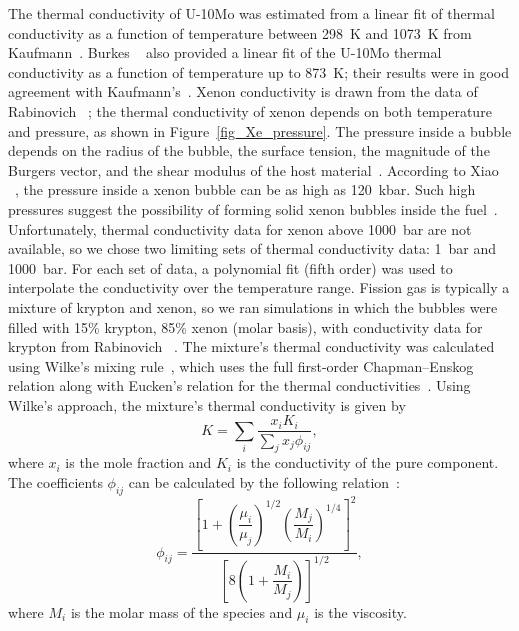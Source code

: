 The thermal conductivity of \mbox{U-10Mo} was estimated from a linear fit of thermal conductivity as a function of temperature between 298~K and 1073~K from Kaufmann~\cite{kaufmann1962nuclear}. Burkes \etal~\cite{burkes2010thermo} also provided a linear fit of the \mbox{U-10Mo} thermal conductivity as a function of temperature up to 873~K; their results were in good agreement with Kaufmann's~\cite{kaufmann1962nuclear}.
{Xenon conductivity is drawn from the data of Rabinovich \etal~\cite{rabinovich1987thermophysical};}
the thermal conductivity of xenon depends on both temperature and pressure,
as shown in Figure~\ref{fig_Xe_pressure}. The pressure inside a bubble depends on the radius of the bubble, the surface tension, the magnitude of the Burgers vector, and the shear modulus of the host material~\cite{greenwood1959role,trinkaus1983energetics}. According to Xiao \etal~\cite{xiao2015atomistic}, the pressure inside a xenon bubble can be as high as 120~kbar. Such high pressures suggest the possibility of forming solid xenon bubbles inside the fuel~\cite{thomas1991condensed,ross1980condensed,zheng2014thermodynamics}. Unfortunately, thermal conductivity data for xenon above 1000~bar are not available, so we chose two limiting sets of thermal conductivity data: 1~bar and 1000~bar. For each set of data, a polynomial fit (fifth order) was used to interpolate the conductivity over the temperature range.
{Fission gas is typically a mixture of krypton and xenon, so
we ran simulations in which the bubbles were filled with 15\% krypton,
85\% xenon (molar basis), with conductivity data for krypton from Rabinovich \etal~\cite{rabinovich1987thermophysical}. The mixture's thermal conductivity was calculated using Wilke's mixing rule~\cite{wilke1950viscosity}, which uses the full first-order Chapman--Enskog relation along with Eucken's relation for the thermal conductivities~\cite{vincenti1965introduction, alkandry2013comparison}. Using Wilke's approach, the mixture's thermal conductivity is given by
\begin{equation}
  K = \sum_i \frac{x_iK_i}{\sum_j x_j \phi_{ij}},
  \label{eq:K-mixture}
\end{equation}
where $x_i$ is the mole fraction and $K_i$ is the conductivity of the pure
component. The coefficients $\phi_{ij}$ can be calculated by the following
relation~\cite{alkandry2013comparison}:
\begin{equation}
  \phi_{ij} = \frac{\left[1+\left(\dfrac{\mu_i}{\mu_j}\right)^{\!\!1/2}\left(\dfrac{M_j}{M_i}\right)^{\!\!1/4}\right]^2}{\left[
    8\left(1+\dfrac{M_i}{M_j}\right)
  \right]^{1/2}},
\end{equation}
where $M_i$ is the molar mass of the species and $\mu_i$ is the viscosity.
}

